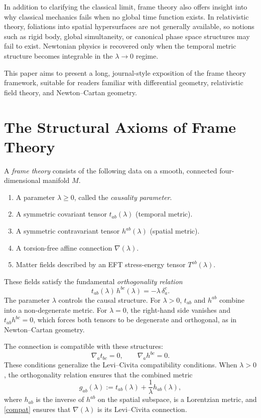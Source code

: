 \documentclass[12pt]{article}
\begin{document}
In addition to clarifying the classical limit, frame theory also offers
insight into why classical mechanics fails when no global time function exists.
In relativistic theory, foliations into spatial hypersurfaces are not generally
available, so notions such as rigid body, global simultaneity, or canonical
phase space structures may fail to exist. 
Newtonian physics is recovered only when the temporal metric structure becomes
integrable in the $\lambda\to 0$ regime.

This paper aims to present a long, journal-style exposition of the frame theory
framework, suitable for readers familiar with differential geometry,
relativistic field theory, and Newton–Cartan geometry.

\section{The Structural Axioms of Frame Theory}

A \emph{frame theory} consists of the following data on a smooth, connected
four-dimensional manifold $M$.

\begin{enumerate}
\item A parameter $\lambda \ge 0$, called the \emph{causality parameter}.
\item A symmetric covariant tensor $t_{ab}(\lambda)$ (temporal metric).
\item A symmetric contravariant tensor $h^{ab}(\lambda)$ (spatial metric).
\item A torsion-free affine connection $\nabla(\lambda)$.
\item Matter fields described by an EFT stress-energy tensor $T^{ab}(\lambda)$.
\end{enumerate}

These fields satisfy the fundamental \emph{orthogonality relation}
\begin{equation}
  t_{ab}(\lambda) \, h^{bc}(\lambda) = - \lambda \, \delta_a^c.
  \label{orth}
\end{equation}
The parameter $\lambda$ controls the causal structure. 
For $\lambda>0$, $t_{ab}$ and $h^{ab}$ combine into a non-degenerate metric.
For $\lambda=0$, the right-hand side vanishes and $t_{ab}h^{bc}=0$, which
forces both tensors to be degenerate and orthogonal, as in Newton–Cartan
geometry.

The connection is compatible with these structures:
\begin{equation}
  \nabla_a t_{bc} = 0, \qquad 
  \nabla_a h^{bc} = 0.
  \label{compat}
\end{equation}
These conditions generalize the Levi--Civita compatibility conditions.
When $\lambda>0$, the orthogonality relation ensures that the combined metric
\begin{equation}
  g_{ab}(\lambda) 
    := t_{ab}(\lambda) + \frac{1}{\lambda} h_{ab}(\lambda),
  \label{metric}
\end{equation}
where $h_{ab}$ is the inverse of $h^{ab}$ on the spatial subspace,
is a Lorentzian metric, and \eqref{compat} ensures that
$\nabla(\lambda)$ is its Levi--Civita connection.
\end{document}
